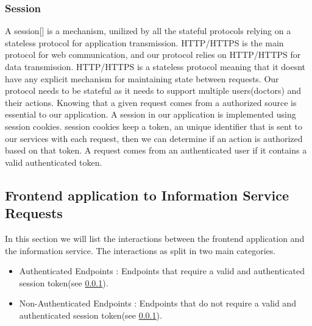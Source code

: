 				\subsubsection{Session}
					\label{session}
					A session[\cite{session-rfc6265}] is a mechanism, unilized by all the stateful protocols relying on a stateless protocol for application transmission.
					HTTP/HTTPS is the main protocol for web communication, and our protocol relies on HTTP/HTTPS for data transmission. HTTP/HTTPS is a stateless protocol
					meaning that it doesnt have any explicit mechanism for maintaining state between requests. Our protocol needs to be stateful as it needs to support
					multiple users(doctors) and their actions. Knowing that a given request comes from a authorized source is essential to our application. A session in our
					application is implemented using session cookies. session cookies keep a token, an unique identifier that is sent to our services with each request, then we
					can determine if an action is authorized based on that token. A request comes from an authenticated user if it contains a valid authenticated token.
			\subsection{Frontend application to Information Service Requests}
				In this section we will list the interactions between the frontend application and the information service. The interactions as split in two 
				main categories.
				\begin{itemize}
					\item Authenticated Endpoints : Endpoints that require a valid and authenticated session token(see \ref{session}).
					\item Non-Authenticated Endpoints : Endpoints that do not require a valid and authenticated session token(see \ref{session}).
				\end{itemize}
